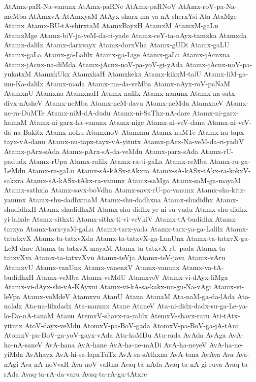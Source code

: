 {AtAmx-paR-Na-vanunx
AtAmx-paRNe
AtAmx-paRNoV
AtAmx-roV-pa-Na-meMba
AtAmxvA
AtAmxyaM
AtAyx-sharx-ma-va-nA-sherxYsi
Ata
AtaMge
Atamx
Atamx-BU-tA-shirxtaM
AtamxBayxH
AtamxM
AtamxM-gaLu
AtamxMge
Atamx-biV-ja-veM-da-ri-yade
Atamx-ceY-ta-nAyx-tamxka
Atamxda
Atamx-dalilx
Atamx-darxvayx
Atamx-dorxVha
Atamx-gUDi
Atamx-gaLU
Atamx-gaLa
Atamx-ga-Lalilx
Atamx-ga-Lige
Atamx-gaLu
Atamx-jAcnxna
Atamx-jAcnx-na-diMda
Atamx-jAcnx-noV-pa-yoV-gi-yAda
Atamx-jAcnx-noV-pa-yukatxM
AtamxkUkx
AtamxkaH
Atamxkekx
Atamx-kikxM-talU
Atamx-liM-ga-mu-Ka-dalilx
Atamx-mada
Atamx-ma-da-veMba
Atamx-nAyx-roV-paNaM
AtamxnU
Atamxna
AtamxnaH
Atamx-nalilx
Atamx-nanunx
Atamx-na-satx-divx-nAsheV
Atamx-neMba
Atamx-neM-davu
Atamx-neMdu
AtamxneV
Atamx-ne-ra-DuMTe
Atamx-niM-dA-dudu
Atamx-ni-SaThx-nA-dare
Atamx-ni-garx-hamaM
Atamx-ni-garx-ha-vanunx
Atamx-nige
Atamx-ni-veV-dana
Atamx-ni-veV-da-na-Bakitx
Atamx-noLu
AtamxnoV
Atamxnu
Atamx-nuMTe
Atamx-nu-tapx-tayx-vA-danu
Atamx-nu-tapx-tayx-vA-yitutx
Atamx-pArx-Na-veM-da-ri-yadiV
Atamx-pArx-sAda
Atamx-pArx-sA-da-veMdu
Atamx-parx-sAda
Atamx-rU-padudx
Atamx-rUpu
Atamx-ralilx
Atamx-ra-ti-gaLa
Atamx-reMba
Atamx-ru-ga-LeMdu
Atamx-ru-gaLu
Atamx-sA-kASx-tAkxra
Atamx-sA-kASx-tAkx-ra-kokxV-sakxra
Atamx-sA-kASx-tAkx-ra-vanunx
Atamx-saMga
Atamx-saM-ga-mayaM
Atamx-sathxla
Atamx-savx-boVdha
Atamx-savx-rU-pa-vanunx
Atamx-sha-kitx-yanunx
Atamx-shu-dadhxmaM
Atamx-shu-dadhxna
Atamx-shudidhx
Atamx-shudidhxH
Atamx-shudidhxM
Atamx-shu-didhx-ye-ni-su-vudu
Atamx-shu-didhx-yi-lalxde
Atamx-sithxti
Atamx-sithx-ti-vi-veVkiV
Atamx-tA-budidhx
Atamx-tarxya
Atamx-tarx-yaM-gaLu
Atamx-tarx-yada
Atamx-tarx-ya-ga-Lalilx
Atamx-tatatxvX
Atamx-ta-tatxvXda
Atamx-ta-tatxvX-ga-LanUnx
Atamx-ta-tatxvX-ga-LeM-dare
Atamx-ta-tatxvX-mayaM
Atamx-ta-tatxvX-rU-pada
Atamx-ta-tatxvXva
Atamx-ta-tatxvXvu
Atamx-teVja
Atamx-teV-java
Atamx-vAru
AtamxvU
Atamx-vanUnx
Atamx-vanenxV
Atamx-vanunx
Atamx-va-tA-budidhxH
Atamx-veMba
Atamx-veMdU
AtamxveV
Atamx-vi-dAyx-liMga
Atamx-vi-dAyx-shi-vA-KAyxni
Atamx-vi-kA-sa-kakx-nu-gu-Na-vAgi
Atamx-vi-leVpa
Atamx-voMdeV
Atamxvu
AtanU
Atana
AtanaM
Ata-naM-ga-da-lAda
Ata-nalalx
Ata-na-lilxdadx
Ata-nanunx
Atane
AtaneV
Ata-ni-didx-dadx-su-ga-Le-ya-lo-Da-nA-tanaM
Atanu
AtemxV-shavx-ra-ralilx
AtemxV-shavx-raru
Ati-tAtx-yitutx
AtoV-dayx-veMdu
AtomxV-pa-BoV-gada
AtomxV-pa-BoV-ga-jA-tAni
AtomxV-pa-BoV-ga-yoV-gayx-vAda
Atu-koMDu
Atu-rada
AvAda
AvAga
AvA-ha-nA-saneV
AvA-hana
AvA-hane
AvA-ha-ne-mADi
AvA-ha-neyeV
AvA-ha-ne-yiMda
AvAhayx
AvA-hi-sa-lapxTuTx
AvA-sa-sAthxna
AvA-tana
AvAva
Ava
Ava-nAgi
Ava-nA-noVvaR
Ava-noV-vaRna
Avaq-ta-nAda
Avaq-ta-nA-gi-ruva
Avaq-ta-rAda
Avaq-ta-rA-da-varu
Avaq-ta-rA-gu-tAtxre
}
